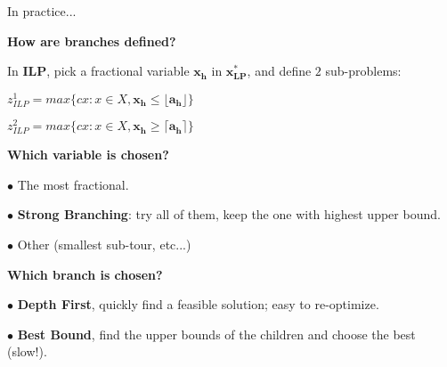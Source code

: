 \documentclass[13pt]{beamer}
\begin{document}

\begin{frame}{In practice...}
    \begin{fullpageitemize}
        \item<1->[\rtarrow]\textbf{How are branches defined?}
        \begin{baseitemize}
            \item<2->In \textbf{ILP}, pick a fractional variable $\mathbf{x_h}$ in $\mathbf{x^*_{LP}}$, and define $2$ sub-problems:
            \item<3->$z^1_{ILP} = max\{cx: x \in X, \mathbf{x_h \leq \lfloor a_h \rfloor}\}$
            \item<3->$z^2_{ILP} = max\{cx: x \in X, \mathbf{x_h \geq \lceil a_h \rceil}\}$
        \end{baseitemize}	
        \item<4->[\rtarrow]\textbf{Which variable is chosen?}
        \begin{baseitemize}
            \item<5->$\bullet$ The most fractional.
            \item<6->$\bullet$ \textbf{Strong Branching}: try all of them, keep the one with highest upper bound.
            \item<7->$\bullet$ Other (smallest sub-tour, etc...)
        \end{baseitemize}	
        \item<8->[\rtarrow]\textbf{Which branch is chosen?}
        \begin{baseitemize}
            \item<9->$\bullet$ \textbf{Depth First}, quickly find a feasible solution; easy to re-optimize.
            \item<10->$\bullet$ \textbf{Best Bound}, find the upper bounds of the children and choose the best (slow!).
        \end{baseitemize}
    \end{fullpageitemize}
\end{frame}   
\end{document}
